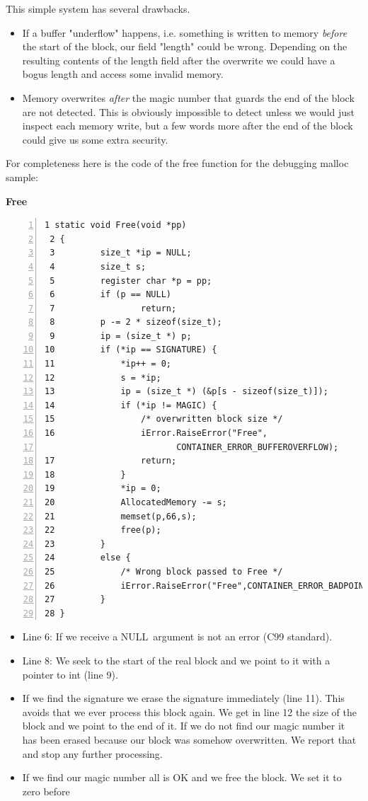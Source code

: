 \documentclass[12pt,a4paper]{memoir} %
\newif\iftth
\newcommand{\container}{}
\newcommand{\function}[1] {%
\vspace{0.2in}
\par\noindent
\textbf{#1}\index{#1!code for \container} \hrulefill
\iftth\else
\nopagebreak
\fi
\noindent\begin{Verbatim}[numbers=left, xleftmargin=7mm]}
\newcommand{\Null}{{\iftth \ NULL \else \footnotesize NULL\  \fi}}
\begin{document}
{{This simple system has several drawbacks.
\begin{itemize}
\item If a buffer "underflow" happens, i.e. something is written to memory \textsl{before} the start of the block, our field "length" could be
wrong. Depending on the resulting contents of the length field after the overwrite we could have a bogus length and access some invalid memory.
\item Memory overwrites \textsl{after} the magic number that guards the end of the block are not detected. This is obviously impossible to detect
unless we would just inspect each memory write, but a few words more after the end of the block could give us some extra security.
\end{itemize}
For completeness here is the code of the free function for the debugging malloc sample:
\function{Free}
 1 static void Free(void *pp)
 2 {
 3         size_t *ip = NULL;
 4         size_t s;
 5         register char *p = pp;
 6         if (p == NULL)
 7                 return;
 8         p -= 2 * sizeof(size_t);
 9         ip = (size_t *) p;
10         if (*ip == SIGNATURE) {
11             *ip++ = 0;
12             s = *ip;
13             ip = (size_t *) (&p[s - sizeof(size_t)]);
14             if (*ip != MAGIC) {
15                 /* overwritten block size */
16                 iError.RaiseError("Free",
                          CONTAINER_ERROR_BUFFEROVERFLOW);
17                 return;
18             }
19             *ip = 0;
20             AllocatedMemory -= s;
21             memset(p,66,s);
22             free(p);
23         }
24         else {
25             /* Wrong block passed to Free */
26             iError.RaiseError("Free",CONTAINER_ERROR_BADPOINTER);
27         }
28 }
\end{Verbatim}
\begin{itemize}
\item Line 6:
If we receive a \Null argument is not an error (C99 standard).
\item Line 8:
We seek to the start of the real block and we point to it with a pointer to int (line 9).
\item
If we find the signature we erase the signature immediately (line 11). This avoids that
we ever process this block again. We get in line 12 the size of the block and we point
to the end of it. If we do not find our magic number it has been erased because our
block was somehow overwritten. We report that and stop any further processing.
\item
If we find our magic number all is OK and we free the block. We set it to zero before

\end{itemize}}}
\end{document}
